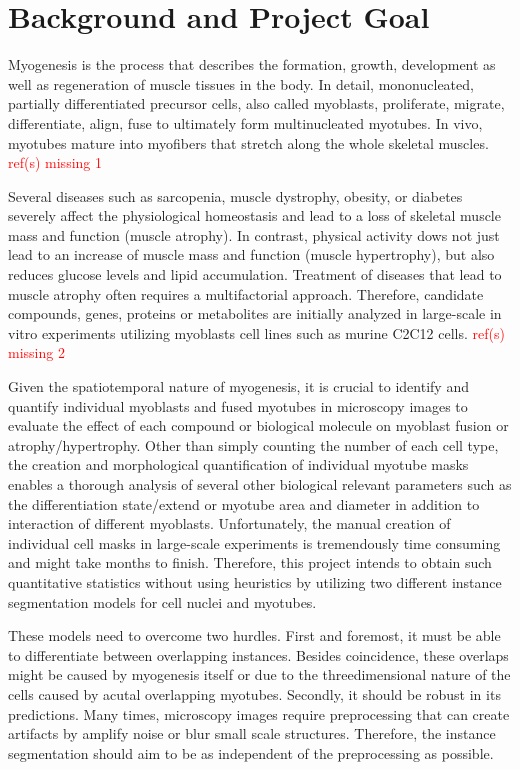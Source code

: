 \section{Background and Project Goal}
Myogenesis is the process that describes the formation, growth, development as well as regeneration of muscle tissues in the body. In detail, mononucleated, partially differentiated precursor cells, also called myoblasts, proliferate, migrate, differentiate, align, fuse to ultimately form multinucleated myotubes. In vivo, myotubes mature into myofibers that stretch along the whole skeletal muscles. \textcolor{red}{ref(s) missing 1}

Several diseases such as sarcopenia, muscle dystrophy, obesity, or diabetes severely affect the physiological homeostasis and lead to a loss of skeletal muscle mass and function (muscle atrophy). In contrast, physical activity dows not just lead to an increase of muscle mass and function (muscle hypertrophy), but also reduces glucose levels and lipid accumulation. Treatment of diseases that lead to muscle atrophy often requires a multifactorial approach. Therefore, candidate compounds, genes, proteins or metabolites are initially analyzed in large-scale in vitro experiments utilizing myoblasts cell lines such as murine C2C12 cells. \textcolor{red}{ref(s) missing 2}

Given the spatiotemporal nature of myogenesis, it is crucial to identify and quantify individual myoblasts and fused myotubes in microscopy images to evaluate the effect of each compound or biological molecule on myoblast fusion or atrophy/hypertrophy. Other than simply counting the number of each cell type, the creation and morphological quantification of individual myotube masks enables a thorough analysis of several other biological relevant parameters such as the differentiation state/extend or myotube area and diameter in addition to interaction of different myoblasts. Unfortunately, the manual creation of individual cell masks in large-scale experiments is tremendously time consuming and might take months to finish. Therefore, this project intends to obtain such quantitative statistics without using heuristics by utilizing two different instance segmentation models for cell nuclei and myotubes.

These models need to overcome two hurdles. First and foremost, it must be able to differentiate between overlapping instances. Besides coincidence, these overlaps might be caused by myogenesis itself or due to the threedimensional nature of the cells caused by acutal overlapping myotubes. Secondly, it should be robust in its predictions. Many times, microscopy images require preprocessing that can create artifacts by amplify noise or blur small scale structures. Therefore, the instance segmentation should aim to be as independent of the preprocessing as possible.

